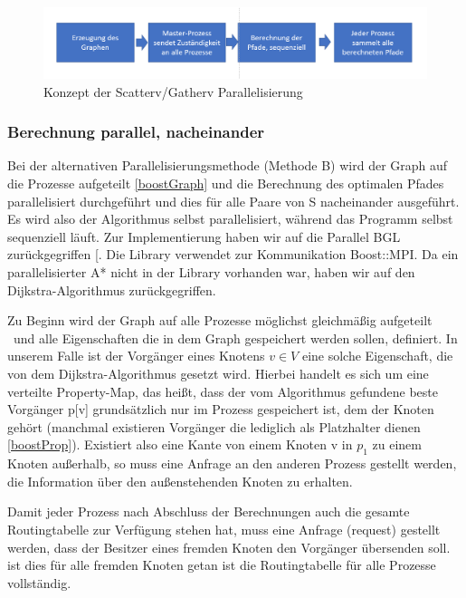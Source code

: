 \documentclass[paper=A4,pagesize=auto,12pt,headinclude=true,footinclude=true,BCOR=0mm,DIV=calc]{scrartcl}
\begin{document}
	\label{parallelA}
		\begin{figure}[H]
			\includegraphics[scale = 0.80]{Prasentation/AblaufParallelA.png}
			\caption{Konzept der Scatterv/Gatherv Parallelisierung}
		\end{figure}
	
	\subsubsection{Berechnung parallel, nacheinander}
	Bei der alternativen Parallelisierungsmethode (Methode B) wird der Graph auf die Prozesse aufgeteilt \ref{boostGraph} und die Berechnung des optimalen Pfades parallelisiert durchgeführt und dies für alle Paare von S nacheinander ausgeführt. Es wird also der Algorithmus selbst parallelisiert, während das Programm selbst sequenziell läuft. Zur Implementierung haben wir auf die Parallel BGL zurückgegriffen [\cite{ParallelBGL}. Die Library verwendet zur Kommunikation Boost::MPI. Da ein parallelisierter A* nicht in der Library vorhanden war, haben wir auf den Dijkstra-Algorithmus zurückgegriffen.
	
	Zu Beginn wird der Graph auf alle Prozesse möglichst gleichmäßig aufgeteilt \ und alle Eigenschaften die in dem Graph gespeichert werden sollen, definiert. In unserem Falle ist der Vorgänger eines Knotens $v \in V$ eine solche Eigenschaft, die von dem Dijkstra-Algorithmus gesetzt wird.
	Hierbei handelt es sich um eine verteilte Property-Map, das heißt, dass der vom Algorithmus gefundene beste Vorgänger p[v] grundsätzlich nur im Prozess gespeichert ist, dem der Knoten gehört (manchmal existieren Vorgänger die lediglich als Platzhalter dienen \ref{boostProp}). Existiert also eine Kante von einem Knoten v in  $p_{1}$ zu einem Knoten außerhalb, so muss eine Anfrage an den anderen Prozess gestellt werden, die Information über den außenstehenden Knoten zu erhalten.
	
	Damit jeder Prozess nach Abschluss der Berechnungen auch die gesamte Routingtabelle zur Verfügung stehen hat, muss eine Anfrage (request) gestellt werden, dass der Besitzer eines fremden Knoten den Vorgänger übersenden soll. ist dies für alle fremden Knoten getan ist die Routingtabelle für alle Prozesse vollständig.
	
\end{document}
